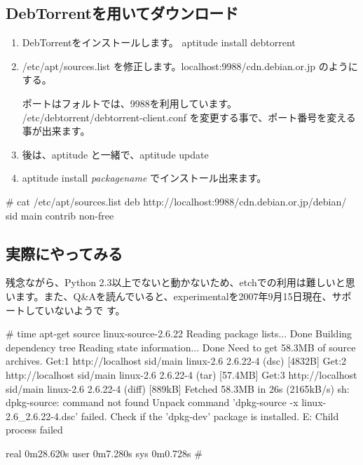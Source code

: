 \documentclass[mingoth,a4paper]{jsarticle}
\begin{document}
\newpage

\subsection{DebTorrentを用いてダウンロード}
\begin{enumerate}
 \item DebTorrentをインストールします。
       aptitude install debtorrent
 \item /etc/apt/sources.list を修正します。localhost:9988/cdn.debian.or.jp のようにする。

       ポートはフォルトでは、9988を利用しています。
       /etc/debtorrent/debtorrent-client.conf
       を変更する事で、ポート番号を変える事が出来ます。
 \item 後は、aptitude と一緒で、aptitude update
 \item aptitude install {\it packagename} でインストール出来ます。
\end{enumerate}

\begin{commandline}
# cat /etc/apt/sources.list
deb http://localhost:9988/cdn.debian.or.jp/debian/ sid main contrib non-free
\end{commandline}

\subsection{実際にやってみる}

残念ながら、Python 2.3以上でないと動かないため、etchでの利用は難しいと思
います。また、Q\&Aを読んでいると、experimentalを2007年9月15日現在、サポートしていないようで
す。

\begin{commandline}
# time apt-get source linux-source-2.6.22
Reading package lists... Done
Building dependency tree       
Reading state information... Done
Need to get 58.3MB of source archives.
Get:1 http://localhost sid/main linux-2.6 2.6.22-4 (dsc) [4832B]
Get:2 http://localhost sid/main linux-2.6 2.6.22-4 (tar) [57.4MB]                                                          
Get:3 http://localhost sid/main linux-2.6 2.6.22-4 (diff) [889kB]                                                          
Fetched 58.3MB in 26s (2165kB/s)                                                                                           
sh: dpkg-source: command not found
Unpack command 'dpkg-source -x linux-2.6_2.6.22-4.dsc' failed.
Check if the 'dpkg-dev' package is installed.
E: Child process failed

real    0m28.620s
user    0m7.280s
sys     0m0.728s
# 
\end{commandline}
\end{document}
